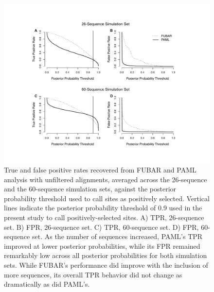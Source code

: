 \documentclass[10pt]{article}
\begin{document}
\begin{figure}[H]
\centerline{\includegraphics[width=7in]{Figures/tprfpr.pdf}}
\caption{\label{tprfpr} True and false positive rates recovered from FUBAR and PAML analysis with unfiltered alignments, averaged across the 26-sequence and the 60-sequence simulation sets, against the posterior probability threshold used to call sites as positively selected. Vertical lines indicate the posterior probability threshold of 0.9 used in the present study to call positively-selected sites. A) TPR, 26-sequence set. B) FPR, 26-sequence set. C) TPR, 60-sequence set. D) FPR, 60-sequence set.  As the number of sequences increased, PAML's TPR improved at lower posterior probabilities, while its FPR remained remarkably low across all posterior probabilities for both simulation sets. While FUBAR's performance did improve with the inclusion of more sequences, its overall TPR behavior did not change as dramatically as did PAML's.}
\end{figure}
\end{document}
